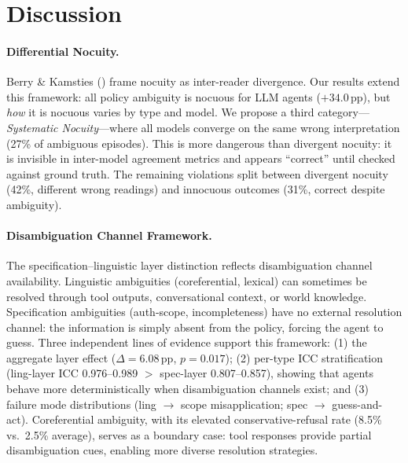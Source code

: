 \documentclass[11pt,a4paper]{article}
\newcommand{\pp}{\,\text{pp}}
\begin{document}
\section{Discussion}
\label{sec:discussion}

\paragraph{Differential Nocuity.}
Berry \& Kamsties (\citeyear{berry2003ambiguity}) frame nocuity as inter-reader divergence.
Our results extend this framework: all policy ambiguity is nocuous for LLM agents ($+34.0\pp$), but \emph{how} it is nocuous varies by type and model.
We propose a third category---\emph{Systematic Nocuity}---where all models converge on the same wrong interpretation (27\% of ambiguous episodes).
This is more dangerous than divergent nocuity: it is invisible in inter-model agreement metrics and appears ``correct'' until checked against ground truth.
The remaining violations split between divergent nocuity (42\%, different wrong readings) and innocuous outcomes (31\%, correct despite ambiguity).

\paragraph{Disambiguation Channel Framework.}
The specification--linguistic layer distinction reflects disambiguation channel availability.
Linguistic ambiguities (coreferential, lexical) can sometimes be resolved through tool outputs, conversational context, or world knowledge.
Specification ambiguities (auth-scope, incompleteness) have no external resolution channel: the information is simply absent from the policy, forcing the agent to guess.
Three independent lines of evidence support this framework: (1) the aggregate layer effect ($\Delta = 6.08\pp$, $p = 0.017$); (2) per-type ICC stratification (ling-layer ICC 0.976--0.989 $>$ spec-layer 0.807--0.857), showing that agents behave more deterministically when disambiguation channels exist; and (3) failure mode distributions (ling $\rightarrow$ scope misapplication; spec $\rightarrow$ guess-and-act).
Coreferential ambiguity, with its elevated conservative-refusal rate (8.5\% vs.\ 2.5\% average), serves as a boundary case: tool responses provide partial disambiguation cues, enabling more diverse resolution strategies.
\end{document}
